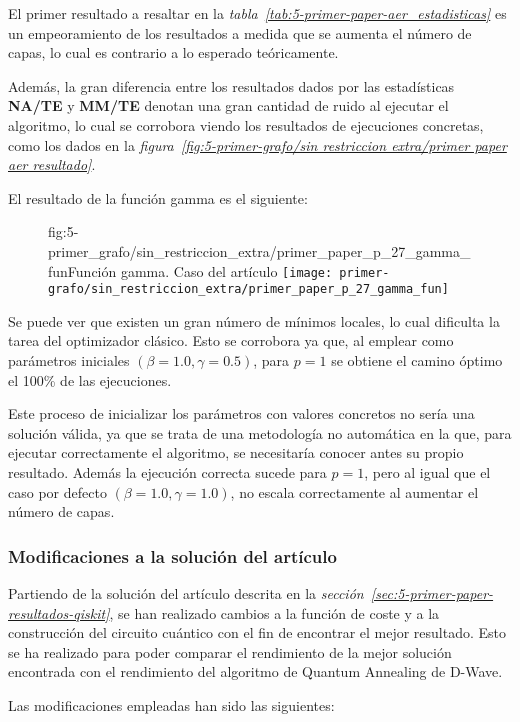 El primer resultado a resaltar en la \textit{tabla~\ref{tab:5-primer-paper-aer_estadisticas}} es un empeoramiento de los resultados a medida que se aumenta el número de capas, lo cual es contrario a lo esperado teóricamente.

Además, la gran diferencia entre los resultados dados por las estadísticas \textbf{NA/TE} y \textbf{MM/TE} denotan una gran cantidad de ruido al ejecutar el algoritmo, lo cual se corrobora viendo los resultados de ejecuciones concretas, como los dados en la \textit{figura~\ref{fig:5-primer-grafo/sin restriccion extra/primer paper aer resultado}}.

El resultado de la función gamma es el siguiente:
\begin{figure}[htbp]{fig:5-primer_grafo/sin_restriccion_extra/primer_paper_p_27_gamma_fun}{Función gamma. Caso del artículo}
  \centering
  \texttt{[image: primer-grafo/sin\_restriccion\_extra/primer\_paper\_p\_27\_gamma\_fun]}
\end{figure}

Se puede ver que existen un gran número de mínimos locales, lo cual dificulta la tarea del optimizador clásico. Esto se corrobora ya que, al emplear como parámetros iniciales $(\beta = 1.0, \gamma = 0.5)$, para $p = 1$ se obtiene el camino óptimo el 100\% de las ejecuciones.

Este proceso de inicializar los parámetros con valores concretos no sería una solución válida, ya que se trata de una metodología no automática en la que, para ejecutar correctamente el algoritmo, se necesitaría conocer antes su propio resultado. Además la ejecución correcta sucede para $p = 1$, pero al igual que el caso por defecto $(\beta = 1.0, \gamma = 1.0)$, no escala correctamente al aumentar el número de capas.

\subsubsection{Modificaciones a la solución del artículo}
Partiendo de la solución del artículo descrita en la \textit{sección~\ref{sec:5-primer-paper-resultados-qiskit}}, se han realizado cambios a la función de coste y a la construcción del circuito cuántico con el fin de encontrar el mejor resultado. Esto se ha realizado para poder comparar el rendimiento de la mejor solución encontrada con el rendimiento del algoritmo de Quantum Annealing de D-Wave.

Las modificaciones empleadas han sido las siguientes:

